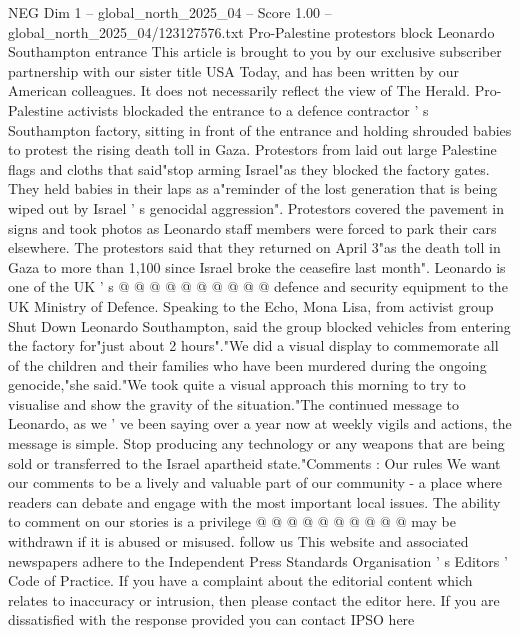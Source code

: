 \begin{textsample}{NEG Dim 1 – global\_north\_2025\_04 – Score 1.00 – global\_north\_2025\_04/123127576.txt}  \label{ex:f1_neg_044}
Pro-Palestine protestors block Leonardo Southampton entrance This article is brought to you by our exclusive subscriber partnership with our sister title USA Today, and has been written by our American colleagues.
It does not necessarily reflect the view of The Herald.
Pro-Palestine activists blockaded the entrance to a defence contractor ' s Southampton factory, sitting in front of the entrance and holding shrouded babies to protest the rising death toll in Gaza.
Protestors from laid out large Palestine flags and cloths that said"stop arming Israel"as they blocked the factory gates.
They held babies in their laps as a"reminder of the lost generation that is being wiped out by Israel ' s genocidal aggression".
Protestors covered the pavement in signs and took photos as Leonardo staff members were forced to park their cars elsewhere.
The protestors said that they returned on April 3"as the death toll in Gaza to more than 1,100 since Israel broke the ceasefire last month".
Leonardo is one of the UK ' s @ @ @ @ @ @ @ @ @ @ defence and security equipment to the UK Ministry of Defence.
Speaking to the Echo, Mona Lisa, from activist group Shut Down Leonardo Southampton, said the group blocked vehicles from entering the factory for"just about 2 hours"."We did a visual display to commemorate all of the children and their families who have been murdered during the ongoing genocide,"she said."We took quite a visual approach this morning to try to visualise and show the gravity of the situation."The continued message to Leonardo, as we ' ve been saying over a year now at weekly vigils and actions, the message is simple.
Stop producing any technology or any weapons that are being sold or transferred to the Israel apartheid state."Comments : Our rules We want our comments to be a lively and valuable part of our community - a place where readers can debate and engage with the most important local issues.
The ability to comment on our stories is a privilege @ @ @ @ @ @ @ @ @ @ may be withdrawn if it is abused or misused. follow us This website and associated newspapers adhere to the Independent Press Standards Organisation ' s Editors ' Code of Practice.
If you have a complaint about the editorial content which relates to inaccuracy or intrusion, then please contact the editor here.
If you are dissatisfied with the response provided you can contact IPSO here

\end{textsample}
